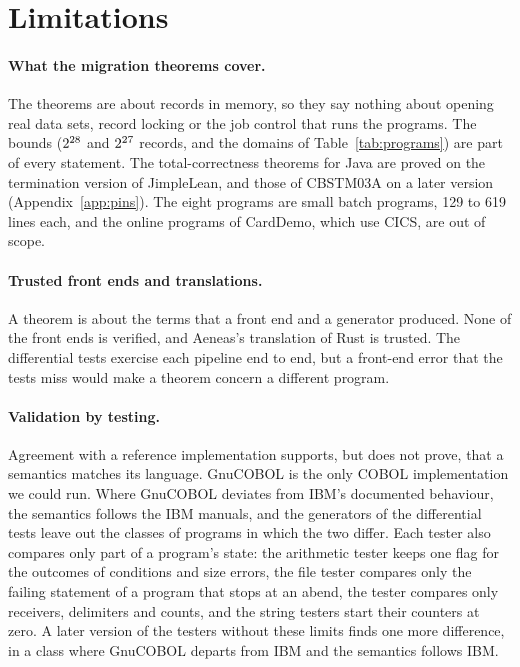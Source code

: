 \section{Limitations}
\label{sec:limits}

\paragraph{What the migration theorems cover.} The theorems are about records in memory,
so they say nothing about opening real data sets, record locking or the job control that runs the programs. The bounds
($2^{28}$ and $2^{27}$ records, and the domains of Table~\ref{tab:programs}) are part of every statement. The total-correctness theorems for Java are proved on the termination version of JimpleLean, and those of CBSTM03A on a
later version (Appendix~\ref{app:pins}). The eight programs are small batch programs, 129 to 619
lines each, and the online programs of CardDemo, which use CICS, are out of scope.

\paragraph{Trusted front ends and translations.} A theorem is about the terms that a front end and a generator
produced. None of the front ends is verified, and Aeneas's translation of Rust is trusted. The differential tests
exercise each pipeline end to end, but a front-end error that the tests miss would make a theorem concern a different
program.

\paragraph{Validation by testing.} Agreement with a reference implementation supports, but does not prove, that a
semantics matches its language. GnuCOBOL is the only COBOL implementation we could run. Where GnuCOBOL deviates from IBM's documented behaviour, the semantics follows the IBM manuals, and the generators of
the differential tests leave out the classes of programs in which the two differ. Each tester also compares only part of a program's state: the arithmetic tester keeps one flag for the
outcomes of conditions and size errors, the file tester compares only the failing statement of a program that stops at
an abend, the  tester compares only receivers, delimiters and counts, and the string testers start their
counters at zero. A
later version of the testers without these limits finds one more difference, in a class where GnuCOBOL departs from
IBM and the semantics follows IBM.

